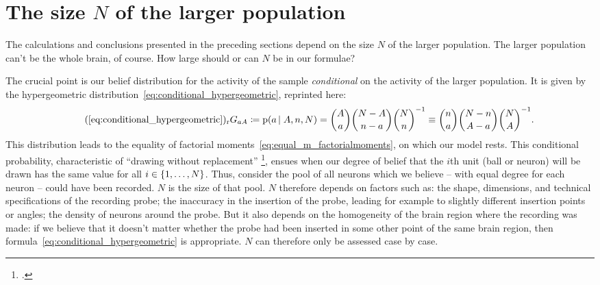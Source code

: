 \documentclass[\ifafour a4paper,12pt,\else a5paper,10pt,\fi%
onecolumn,oneside,article,%
british%
]{memoir}
\theoremstyle{remark}
\theoremstyle{innote}
\newcommand*{\citep}{\footcites}
\newcommand*{\defd}{\coloneqq}
\DeclarePairedDelimiter\set{\{}{\}}
\newcommand*{\pf}{\mathrm{p}}%
\renewcommand*{\|}{\nonscript\,\vert\nonscript\;\mathopen{}}
\newcommand*{\sect}{\S}%
\newcommand*{\chap}{ch.}%
\newcommand*{\labelbis}[1]{\tag*{(\ref{#1})$_\text{r}$}}
\newcommand*{\yG}{G}
\newcommand*{\yAv}{A}
\newcommand*{\yav}{a}
\newcommand*{\ya}{\yav}%
\newcommand*{\yA}{\yAv}%
\begin{document}
\section{The size $N$ of the larger population}
\label{sec:N}

%
% 

The calculations and conclusions presented in the preceding sections depend
on the size $N$ of the larger population. The larger population can't be
the whole brain, of course. How large should or can $N$ be in our formulae?

The crucial point is our belief distribution for the activity of the sample
\emph{conditional} on the activity of the larger population. It is given by
the hypergeometric distribution~\eqref{eq:conditional_hypergeometric},
reprinted here:
\begin{equation}
  \labelbis{eq:conditional_hypergeometric}
  \yG_{\ya\yA} \defd \pf(\ya \|\yA, n,N)=
    \binom{\yA}{\ya}\binom{N-\yA}{n-\ya}\binom{N}{n}^{-1}
\equiv \binom{n}{\ya}\binom{N-n}{\yA-\ya}\binom{N}{\yA}^{-1}.
\end{equation}
This distribution leads to the equality of factorial
moments~\eqref{eq:equal_m_factorialmoments}, on which our model rests. This
conditional probability, characteristic of \enquote{drawing without
  replacement}
\citep[\chap~3]{jaynes1994_r2003}[\sect~4.8.3]{ross1976_r2010}[\sect~II.6]{feller1950_r1968},
ensues when our degree of belief that the $i$th unit (ball or neuron) will
be drawn has the same value for all $i \in \set{1,\dotsc,N}$. Thus,
consider the pool of all neurons which we believe -- with equal degree for
each neuron -- could have been recorded. $N$ is the size of that pool. $N$
therefore depends on factors such as: the shape, dimensions, and technical
specifications of the recording probe; the inaccuracy in the insertion of
the probe, leading for example to slightly different insertion points or
angles; the density of neurons around the probe. But it also depends on the
homogeneity of the brain region where the recording was made: if we believe
that it doesn't matter whether the probe had been inserted in some other
point of the same brain region, then
formula~\eqref{eq:conditional_hypergeometric} is appropriate. $N$ can
therefore only be assessed case by case.
\end{document}
